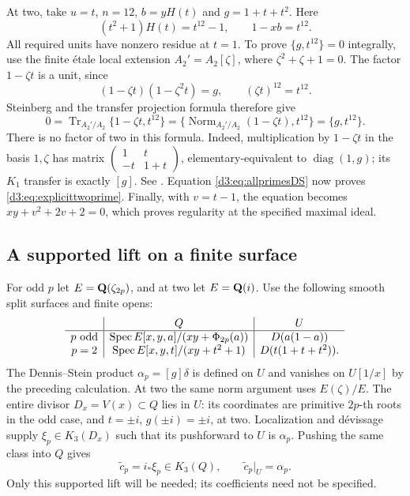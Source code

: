 At two, take $u=t$, $n=12$, $b=yH(t)$ and $g=1+t+t^2$.
Here
\[
 (t^2+1)H(t)=t^{12}-1,\qquad 1-xb=t^{12}.
\]
All required units have nonzero residue at $t=1$. To prove
$\{g,t^{12}\}=0$ integrally, use the finite \'etale local extension
$A_2'=A_2[\zeta]$, where $\zeta^2+\zeta+1=0$.
The factor $1-\zeta t$ is a unit, since
\[
 (1-\zeta t)(1-\zeta^2t)=g,
 \qquad (\zeta t)^{12}=t^{12}.
\]
Steinberg and the transfer projection formula therefore give
\[
 0=\operatorname{Tr}_{A_2'/A_2}
       \{1-\zeta t,t^{12}\}
   =\{\operatorname{Norm}_{A_2'/A_2}(1-\zeta t),t^{12}\}
   =\{g,t^{12}\}.
\]
There is no factor of two in this formula. Indeed, multiplication by
$1-\zeta t$ in the basis $1,\zeta$ has matrix
$\left(\begin{smallmatrix}1&t\\-t&1+t\end{smallmatrix}\right)$,
elementary-equivalent to $\operatorname{diag}(1,g)$; its $K_1$ transfer is exactly $[g]$.
See \cite[Chapter~III, Definition~5.11 and relations (D1)--(D3)]{Weibel}.
Equation \eqref{d3:eq:allprimesDS} now proves \eqref{d3:eq:explicittwoprime}.
Finally, with $v=t-1$, the equation becomes
$xy+v^2+2v+2=0$, which proves regularity at the specified maximal ideal.

\subsection{A supported lift on a finite surface}

For odd $p$ let $E=\mathbf Q(\zeta_{2p})$, and at two let $E=\mathbf Q(i)$.
Use the following smooth split surfaces and finite opens:
\[
\begin{array}{c|c|c}
 & Q & U\\ \hline
p\text{ odd}
 & \operatorname{Spec} E[x,y,a]/(xy+\Phi_{2p}(a))
 & D(a(1-a))\\
p=2
 & \operatorname{Spec} E[x,y,t]/(xy+t^2+1)
 & D(t(1+t+t^2)).
\end{array}
\]
The Dennis--Stein product $\alpha_p=[g]\delta$ is defined on $U$
and vanishes on $U[1/x]$ by the preceding calculation.
At two the same norm argument uses $E(\zeta)/E$.
The entire divisor $D_x=V(x)\subset Q$ lies in $U$:
its coordinates are primitive $2p$-th roots in the odd case, and
$t=\pm i$, $g(\pm i)=\pm i$, at two.
Localization and d\'evissage supply $\xi_p\in K_3(D_x)$ such that its
pushforward to $U$ is $\alpha_p$. Pushing the same class into $Q$ gives
\begin{equation}\label{d3:eq:allprimeslift}
 \widetilde c_p=i_*\xi_p\in K_3(Q),
 \qquad \widetilde c_p|_U=\alpha_p.
\end{equation}
Only this supported lift will be needed; its coefficients need not be specified.

